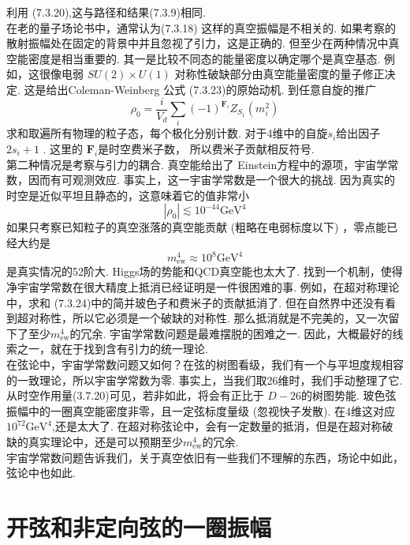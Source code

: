 利用 (7.3.20),这与路径和结果(7.3.9)相同.\\
在老的量子场论书中，通常认为(7.3.18) 这样的真空振幅是不相关的. 如果考察的散射振幅处在固定的背景中并且忽视了引力，这是正确的. 但至少在两种情况中真空能密度是相当重要的. 其一是比较不同态的能量密度以确定哪个是真空基态. 例如，这很像电弱 $S U(2) \times U(1)$ 对称性破缺部分由真空能量密度的量子修正决定. 这是给出Coleman-Weinberg 公式 (7.3.23)的原始动机. 到任意自旋的推广
\begin{equation}
	\rho_{0}=\frac{i}{V_{d}} \sum_{i}(-1)^{\mathbf{F}_{i}} Z_{S_{1}}\left(m_{i}^{2}\right)
\end{equation}
求和取遍所有物理的粒子态，每个极化分别计数. 对于4维中的自旋$s_{i}$给出因子 $2 s_{i}+1$ . 这里的 $\mathbf{F}_{i}$是时空费米子数， 所以费米子贡献相反符号.\\
第二种情况是考察与引力的耦合. 真空能给出了 Einstein方程中的源项，宇宙学常数，因而有可观测效应. 事实上，这一宇宙学常数是一个很大的挑战. 因为真实的时空是近似平坦且静态的，这意味着它的值非常小
\begin{equation}
	\left|\rho_{0}\right| \lesssim 10^{-44} \mathrm{GeV}^{4}
\end{equation}
如果只考察已知粒子的真空涨落的真空能贡献 (粗略在电弱标度以下) ，零点能已经大约是
\begin{equation}
	m_{\mathrm{ew}}^{4} \approx 10^{8} \mathrm{GeV}^{4}
\end{equation}
是真实情况的52阶大. Higgs场的势能和QCD真空能也太大了. 找到一个机制，使得净宇宙学常数在很大精度上抵消已经证明是一件很困难的事. 例如，在超对称理论中，求和 (7.3.24)中的简并玻色子和费米子的贡献抵消了. 但在自然界中还没有看到超对称性，所以它必须是一个破缺的对称性. 那么抵消就是不完美的，又一次留下了至少$m_{\mathrm{ew}}^{4} $的冗余. 宇宙学常数问题是最难摆脱的困难之一. 因此，大概最好的线索之一，就在于找到含有引力的统一理论.\\
在弦论中，宇宙学常数问题又如何？在弦的树图看级，我们有一个与平坦度规相容的一致理论，所以宇宙学常数为零. 事实上，当我们取26维时，我们手动整理了它. 从时空作用量(3.7.20)可见，若非如此，将会有正比于 $D-26$的树图势能. 玻色弦振幅中的一圈真空能密度非零，且一定弦标度量级 (忽视快子发散). 在4维这对应 $10^{72} \mathrm{GeV}^{4}$,还是太大了. 在超对称弦论中，会有一定数量的抵消，但是在超对称破缺的真实理论中，还是可以预期至少$m_{\mathrm{ew}}^{4}$的冗余.\\
宇宙学常数问题告诉我们，关于真空依旧有一些我们不理解的东西，场论中如此，弦论中也如此.

\section{开弦和非定向弦的一圈振幅}%

